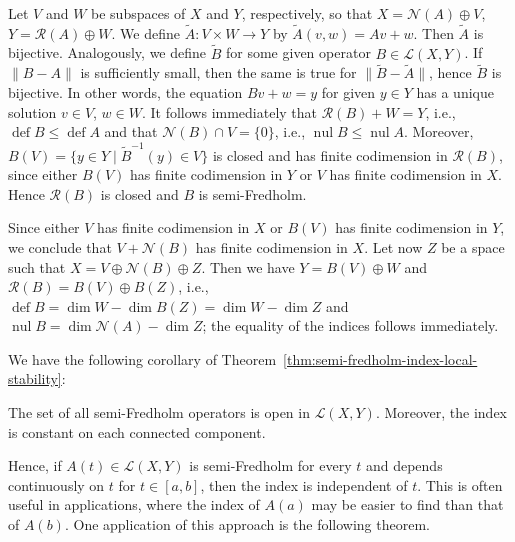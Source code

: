 \begin{Proof}
Let $V$ and $W$ be subspaces of $X$ and $Y$, respectively, so that $X=\mathcal{N}(A)\oplus V$, $Y=\mathcal{R}(A)\oplus W$. We define $\widetilde A:V\times W\to Y$ by $\widetilde A(v,w)=Av+w$. Then $\widetilde A$ is bijective. Analogously, we define $\widetilde B$ for some given operator $B\in\mathcal{L}(X,Y)$. If $\|B-A\|$ is sufficiently small, then the same is true for $\|\widetilde B-\widetilde A\|$, hence $\widetilde B$ is bijective. In other words, the equation $Bv+w=y$ for given $y\in Y$ has a unique solution $v\in V$, $w\in W$. It follows immediately that $\mathcal{R}(B)+W=Y$, i.e., $\operatorname{def}B\leq\operatorname{def}A$ and that $\mathcal{N}(B)\cap V=\{0\}$, i.e., $\operatorname{nul}B\leq\operatorname{nul}A$. Moreover, $B(V)=\{y\in Y\mid\widetilde B^{-1}(y)\in V\}$ is closed and has finite codimension in $\mathcal{R}(B)$, since either $B(V)$ has finite codimension in $Y$ or $V$ has finite codimension in $X$. Hence $\mathcal{R}(B)$ is closed and $B$ is semi-Fredholm.

Since either $V$ has finite codimension in $X$ or $B(V)$ has finite codimension in $Y$, we conclude that $V+\mathcal{N}(B)$ has finite codimension in $X$. Let now $Z$ be a space such that $X=V\oplus\mathcal{N}(B)\oplus Z$. Then we have $Y=B(V)\oplus W$ and $\mathcal{R}(B)=B(V)\oplus B(Z)$, i.e., $\operatorname{def}B=\dim W-\dim B(Z)=\dim W-\dim Z$ and $\operatorname{nul}B=\dim\mathcal{N}(A)-\dim Z$; the equality of the indices follows immediately.
\end{Proof}

We have the following corollary of Theorem~\ref{thm:semi-fredholm-index-local-stability}:

\begin{Corollary}
\label{cor:semi-fredholm-open-set-constant-index}
The set of all semi-Fredholm operators is open in $\mathcal{L}(X,Y)$. Moreover, the index is constant on each connected component.
\end{Corollary}

Hence, if $A(t)\in\mathcal{L}(X,Y)$ is semi-Fredholm for every $t$ and depends continuously on $t$ for $t\in[a,b]$, then the index is independent of $t$. This is often useful in applications, where the index of $A(a)$ may be easier to find than that of $A(b)$. One application of this approach is the following theorem.
